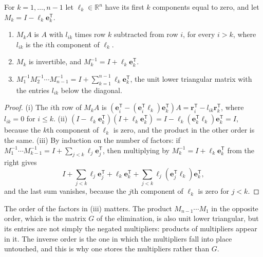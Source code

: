 \begin{lemma}
\label{lem:gauss-transforms}
For $k=1,\ldots,n-1$ let $\boldsymbol\ell_k\in\mathbb R^n$ have its first $k$ components equal to zero, and let $M_k=I-\boldsymbol\ell_k\mathbf e_k^{\mathsf T}$.
\begin{enumerate}
\item $M_kA$ is $A$ with $l_{ik}$ times row $k$ subtracted from row $i$, for every $i>k$, where $l_{ik}$ is the $i$th component of $\boldsymbol\ell_k$.
\item $M_k$ is invertible, and $M_k^{-1}=I+\boldsymbol\ell_k\mathbf e_k^{\mathsf T}$.
\item $M_1^{-1}M_2^{-1}\cdots M_{n-1}^{-1}=I+\sum_{k=1}^{n-1}\boldsymbol\ell_k\mathbf e_k^{\mathsf T}$, the unit lower triangular matrix with the entries $l_{ik}$ below the diagonal.
\end{enumerate}
\end{lemma}

\begin{proof}
(i) The $i$th row of $M_kA$ is $(\mathbf e_i^{\mathsf T}-(\mathbf e_i^{\mathsf T}\boldsymbol\ell_k)\mathbf e_k^{\mathsf T})A=\mathbf r_i^{\mathsf T}-l_{ik}\mathbf r_k^{\mathsf T}$, where $l_{ik}=0$ for $i\le k$. (ii) $(I-\boldsymbol\ell_k\mathbf e_k^{\mathsf T})(I+\boldsymbol\ell_k\mathbf e_k^{\mathsf T})=I-\boldsymbol\ell_k(\mathbf e_k^{\mathsf T}\boldsymbol\ell_k)\mathbf e_k^{\mathsf T}=I$, because the $k$th component of $\boldsymbol\ell_k$ is zero, and the product in the other order is the same. (iii) By induction on the number of factors: if $M_1^{-1}\cdots M_{k-1}^{-1}=I+\sum_{j<k}\boldsymbol\ell_j\mathbf e_j^{\mathsf T}$, then multiplying by $M_k^{-1}=I+\boldsymbol\ell_k\mathbf e_k^{\mathsf T}$ from the right gives
\[
I+\sum_{j<k}\boldsymbol\ell_j\mathbf e_j^{\mathsf T}+\boldsymbol\ell_k\mathbf e_k^{\mathsf T}+\sum_{j<k}\boldsymbol\ell_j(\mathbf e_j^{\mathsf T}\boldsymbol\ell_k)\mathbf e_k^{\mathsf T},
\]
and the last sum vanishes, because the $j$th component of $\boldsymbol\ell_k$ is zero for $j<k$.
\end{proof}

The order of the factors in (iii) matters. The product $M_{n-1}\cdots M_1$ in the opposite order, which is the matrix $G$ of the elimination, is also unit lower triangular, but its entries are not simply the negated multipliers: products of multipliers appear in it. The inverse order is the one in which the multipliers fall into place untouched, and this is why one stores the multipliers rather than $G$.

